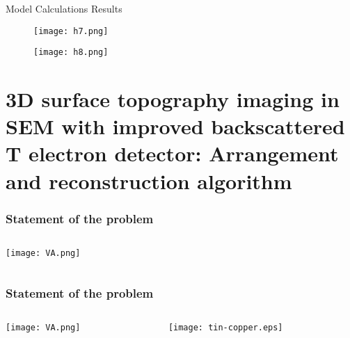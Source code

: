 \documentclass{beamer}
\begin{document}
\begin{frame}[c, allowframebreaks]{Model Calculations Results}

    \begin{figure}[t]
        \texttt{[image: h7.png]}\label{fig:h7}
    \end{figure}

    \framebreak

    \begin{figure}
        \texttt{[image: h8.png]}\label{fig:h8}
    \end{figure}
\end{frame}



\section{3D surface topography imaging in SEM with improved backscattered T
electron detector: Arrangement and reconstruction algorithm}
\begin{frame}
    \sectionpage
\end{frame}

\begin{frame}[c]
    \frametitle{Statement of the problem}
    \begin{columns}
        \begin{column}{0.5\textwidth}
            \texttt{[image: VA.png]}
        \end{column}
        \begin{column}{0.5\textwidth}
        \end{column}
    \end{columns}
\end{frame}

\begin{frame}[c]
    \frametitle{Statement of the problem}
    \begin{columns}
        \begin{column}{0.38\textwidth}
            \texttt{[image: VA.png]}
        \end{column}
        \begin{column}{0.58\textwidth}
            \texttt{[image: tin-copper.eps]}
        \end{column}
    \end{columns}
\end{frame}
\end{document}
